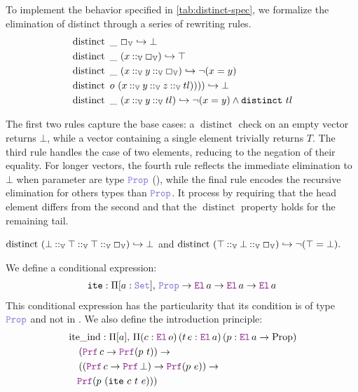 \begin{definition}
To implement the behavior specified in \cref{tab:distinct-spec}, we formalize the elimination of distinct through a series of rewriting rules.
\begin{align*}
&\mathop{\mathrm{distinct}}~ \mathbin{\_}~\Box_\mathbb{V} \hookrightarrow \bot \\
&\mathop{\mathrm{distinct}}~\mathbin{\_}~ (x \mathbin{::}_\mathbb{V} \Box_\mathbb{V}) \hookrightarrow \top \\
&\mathop{\mathrm{distinct}}~\mathbin{\_}~ (x \mathbin{::}_\mathbb{V} y \mathbin{::}_\mathbb{V}  \Box_\mathbb{V}) \hookrightarrow \neg (x = y) \\
&\mathop{\mathrm{distinct}}~o~(x \mathbin{::}_\mathbb{V} y \mathbin{::}_\mathbb{V} z \mathbin{::}_\mathbb{V} tl)))) \hookrightarrow \bot \\
&\mathop{\mathrm{distinct}}~\_~(x \mathbin{::}_\mathbb{V} y \mathbin{::}_\mathbb{V} tl) \hookrightarrow \neg (x = y) \land \texttt{\upshape{distinct}}~tl
\end{align*}

The first two rules capture the base cases: a \(\mathop{\mathrm{distinct}}\) check on an empty vector returns $\bot$, while a vector containing a single element trivially returns $T$.
The third rule handles the case of two elements, reducing to the negation of their equality.
For longer vectors, the fourth rule reflects the immediate elimination to  $\bot$ when parameter are type $\prop$ (),
while the final rule encodes the recursive elimination for others types than $\prop$. It process by requiring that the head element differs from the second and that the
\(\mathop{\mathrm{distinct}}\) property holds for the remaining tail.
\end{definition}

\begin{example}
\(
    \mathop{\mathrm{distinct}}~(\bot \mathbin{::}_\mathbb{V} \top \mathbin{::}_\mathbb{V} \top \mathbin{::}_\mathbb{V} \Box_\mathbb{V}) \hookrightarrow \bot
\)
and
\(
    \mathop{\mathrm{distinct}}~(\top \mathbin{::}_\mathbb{V} \bot \mathbin{::}_\mathbb{V} \Box_\mathbb{V}) \hookrightarrow \neg (\top = \bot).
\)
\end{example}

\begin{definition}
We define a conditional expression:
\begin{align*}
\kw{ite}\index{\kw{ite}}: \Pi [a: \set],\, \prop \ra \el\,a \ra \el\,a \ra \el\,a
\end{align*}
This conditional expression has the particularity that its condition is of type $\prop$ and not in \B.
We also define the introduction principle:
\begin{align*}
&\mathop{\mathrm{ite\_ind}} : \Pi [a],\, \Pi (c : \el\,o)\, (t\, e : \el\,a)\, (p : \el\,a \ra \mathrm{Prop})\\
&\quad\left( \prf\,c \ra \prf(p~t) \right) \ra \\
&\quad\left( (\prf\,c \ra \prf\,\bot) \ra \prf(p~e) \right) \ra \\
&\quad\prf(p~(\kw{ite}~c~t~e)))
\end{align*}
\end{definition}

